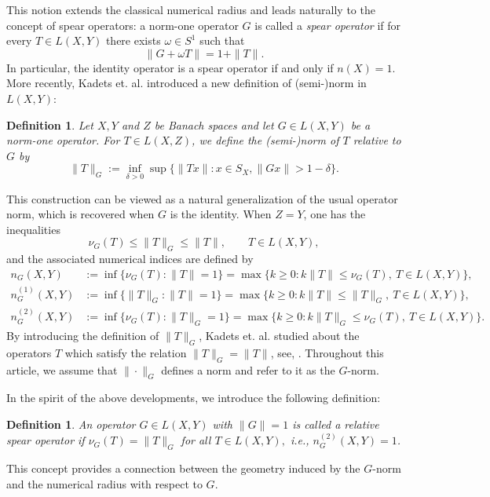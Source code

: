\documentclass[12pt]{amsart}
\newtheorem{definition}[theorem]{Definition}
\theoremstyle{definition}
\numberwithin{equation}{section}
\begin{document}
    This notion extends the classical numerical radius and leads naturally to the concept of spear operators: a norm-one operator $G$ is called a \emph{spear operator} if for every $T\in L(X,Y)$ there exists $\omega\in S^1$ such that
    \[
    \|G+\omega T\|=1+\|T\|.
    \]
    In particular, the identity operator is a spear operator if and only if $n(X)=1$. More recently, Kadets et. al. \cite{Generatingoperator} introduced a new definition of (semi-)norm in $L(X, Y)$:
	\begin{definition}\cite{Generatingoperator}
		Let $X, Y$ and $Z$ be Banach spaces and let $G \in L(X,Y)$ be a norm-one operator. For $T \in L(X,Z)$, we define the (semi-)norm of $T$ relative to $G$ by
		\[
		\|T\|_G := \inf_{\delta>0}\sup\{\|Tx\|:x\in S_X, \|Gx\|>1-\delta\}.
		\]
	\end{definition}
	\noindent
    This construction can be viewed as a natural generalization of the usual operator norm, which is recovered when $G$ is the identity. When $Z = Y$, one has the inequalities
    \[
    \nu_G(T)\leq \|T\|_G\leq \|T\|, \qquad T\in L(X,Y),
    \]
    and the associated numerical indices are defined by
	\begin{align*}
		n_{G}(X,Y)
		&:= \inf \bigl\{ \nu_{G}(T) : \|T\| = 1 \bigr\}= \max \bigl\{ k \ge 0 : k \|T\| \le \nu_{G}(T),\ T \in  L(X, Y) \bigr\},\\
		n^{(1)}_{G}(X,Y)
		&:= \inf \bigl\{ \|T\|_G : \|T\| = 1 \bigr\}= \max \bigl\{ k \ge 0 : k \|T\| \le \|T\|_G,\ T \in  L(X, Y) \bigr\},\\
		n^{(2)}_{G}(X,Y)
		&:= \inf \bigl\{ \nu_{G}(T) : \|T\|_{G} = 1 \bigr\}= \max \bigl\{ k \ge 0 : k \|T\|_{G} \le \nu_{G}(T),\ T \in  L(X, Y) \bigr\}.
	\end{align*}
	By introducing the definition of $\|T\|_G$, Kadets et. al. studied about the operators $T$ which satisfy the relation $\|T\|_G=\|T\|$, see, \cite{Generatingoperator}. Throughout this article, we assume that $\|\cdot\|_G$ defines a norm and refer to it as the $G$-norm.
    
	
	\medskip
	
	
	In the spirit of the above developments, we introduce the following definition:
	\begin{definition}
		An operator $G\in L(X,Y)$ with $\|G\|=1$ is called a relative spear operator if $\nu_G(T)=\|T\|_G$ for all $T\in L(X,Y),$ i.e., $n^{(2)}_{G}(X,Y)=1$.
	\end{definition}
    \noindent
    This concept provides a connection between the geometry induced by the $G$-norm and the numerical radius with respect to $G$. 
    
\end{document}
